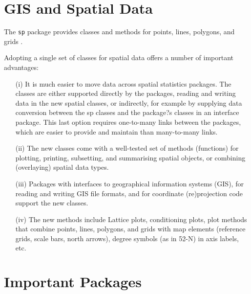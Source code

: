 \documentclass[a4paper,12pt]{article}
\begin{document}
\section{GIS and Spatial Data}
The \texttt{sp} package provides classes and methods for points, lines, polygons, and grids . 

Adopting a single set of classes for spatial data
offers a number of important advantages:
\begin{itemize}
\item[(i)] It is much easier to move data across spatial statistics packages. The
classes are either supported directly by the packages, reading and writing
data in the new spatial classes, or indirectly, for example by supplying
data conversion between the sp classes and the package?s classes in an
interface package. This last option requires one-to-many links between the
packages, which are easier to provide and maintain than many-to-many
links.
\item[(ii)] The new classes come with a well-tested set of methods (functions) for
plotting, printing, subsetting, and summarising spatial objects, or combining
(overlaying) spatial data types.
\item[(iii)] Packages with interfaces to geographical information systems (GIS), for
reading and writing GIS file formats, and for coordinate (re)projection
code support the new classes.
\item[(iv)] The new methods include Lattice plots, conditioning plots, plot methods
that combine points, lines, polygons, and grids with map elements (reference
grids, scale bars, north arrows), degree symbols (as in 52-N) in axis
labels, etc.
\end{itemize}
\section{Important Packages}
\end{document}
